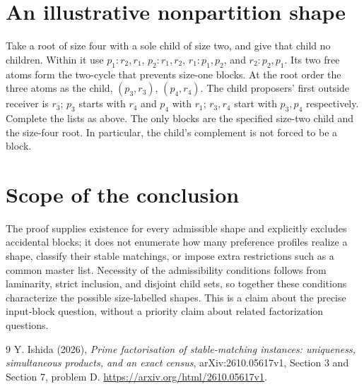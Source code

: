 \documentclass[11pt]{article}
\theoremstyle{definition}
\begin{document}
\section*{An illustrative nonpartition shape}
Take a root of size four with a sole child of size two, and give that
child no children. Within it use $p_1:r_2,r_1$,
$p_2:r_1,r_2$, $r_1:p_1,p_2$, and $r_2:p_2,p_1$.
Its two free atoms form the two-cycle that prevents size-one blocks.
At the root order the three atoms as the child, $(p_3,r_3)$,
$(p_4,r_4)$. The child proposers' first outside receiver is $r_3$;
$p_3$ starts with $r_4$ and $p_4$ with $r_1$; $r_3,r_4$ start with
$p_3,p_4$ respectively. Complete the lists as above. The only blocks
are the specified size-two child and the size-four root. In particular,
the child's complement is not forced to be a block.

\section*{Scope of the conclusion}
The proof supplies existence for every admissible shape and explicitly
excludes accidental blocks; it does not enumerate how many preference
profiles realize a shape, classify their stable matchings, or impose
extra restrictions such as a common master list. Necessity of the
admissibility conditions follows from laminarity, strict inclusion,
and disjoint child sets, so together these conditions characterize
the possible size-labelled shapes. This is a claim about the precise
input-block question, without a priority claim about related
factorization questions.

\begin{thebibliography}{9}
 Y. Ishida (2026), \emph{Prime factorisation of
stable-matching instances: uniqueness, simultaneous products, and an
exact census}, arXiv:2610.05617v1, Section 3 and Section 7, problem D.
\url{https://arxiv.org/html/2610.05617v1}.
\end{thebibliography}
\end{document}
